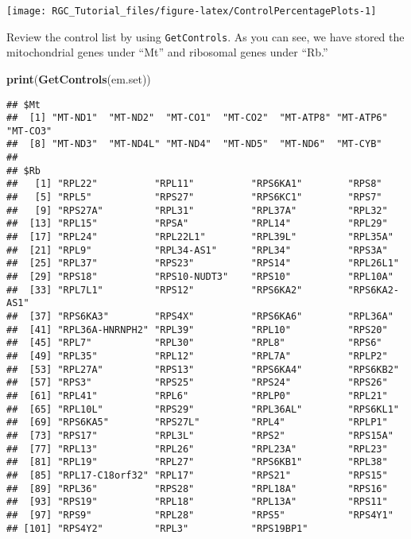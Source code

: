 \documentclass[]{article}
\newenvironment{Shaded}{\begin{snugshade}}{\end{snugshade}}
\newcommand{\KeywordTok}[1]{\textcolor[rgb]{0.13,0.29,0.53}{\textbf{#1}}}
\newcommand{\NormalTok}[1]{#1}
\begin{document}
\begin{center}\texttt{[image: RGC\_Tutorial\_files/figure-latex/ControlPercentagePlots-1]} \end{center}

Review the control list by using \texttt{GetControls}. As you can see,
we have stored the mitochondrial genes under ``Mt'' and ribosomal genes
under ``Rb.''

\begin{Shaded}
\begin{Highlighting}[]
\KeywordTok{print}\NormalTok{(}\KeywordTok{GetControls}\NormalTok{(em.set))}
\end{Highlighting}
\end{Shaded}

\begin{verbatim}
## $Mt
##  [1] "MT-ND1"  "MT-ND2"  "MT-CO1"  "MT-CO2"  "MT-ATP8" "MT-ATP6" "MT-CO3" 
##  [8] "MT-ND3"  "MT-ND4L" "MT-ND4"  "MT-ND5"  "MT-ND6"  "MT-CYB" 
## 
## $Rb
##   [1] "RPL22"          "RPL11"          "RPS6KA1"        "RPS8"          
##   [5] "RPL5"           "RPS27"          "RPS6KC1"        "RPS7"          
##   [9] "RPS27A"         "RPL31"          "RPL37A"         "RPL32"         
##  [13] "RPL15"          "RPSA"           "RPL14"          "RPL29"         
##  [17] "RPL24"          "RPL22L1"        "RPL39L"         "RPL35A"        
##  [21] "RPL9"           "RPL34-AS1"      "RPL34"          "RPS3A"         
##  [25] "RPL37"          "RPS23"          "RPS14"          "RPL26L1"       
##  [29] "RPS18"          "RPS10-NUDT3"    "RPS10"          "RPL10A"        
##  [33] "RPL7L1"         "RPS12"          "RPS6KA2"        "RPS6KA2-AS1"   
##  [37] "RPS6KA3"        "RPS4X"          "RPS6KA6"        "RPL36A"        
##  [41] "RPL36A-HNRNPH2" "RPL39"          "RPL10"          "RPS20"         
##  [45] "RPL7"           "RPL30"          "RPL8"           "RPS6"          
##  [49] "RPL35"          "RPL12"          "RPL7A"          "RPLP2"         
##  [53] "RPL27A"         "RPS13"          "RPS6KA4"        "RPS6KB2"       
##  [57] "RPS3"           "RPS25"          "RPS24"          "RPS26"         
##  [61] "RPL41"          "RPL6"           "RPLP0"          "RPL21"         
##  [65] "RPL10L"         "RPS29"          "RPL36AL"        "RPS6KL1"       
##  [69] "RPS6KA5"        "RPS27L"         "RPL4"           "RPLP1"         
##  [73] "RPS17"          "RPL3L"          "RPS2"           "RPS15A"        
##  [77] "RPL13"          "RPL26"          "RPL23A"         "RPL23"         
##  [81] "RPL19"          "RPL27"          "RPS6KB1"        "RPL38"         
##  [85] "RPL17-C18orf32" "RPL17"          "RPS21"          "RPS15"         
##  [89] "RPL36"          "RPS28"          "RPL18A"         "RPS16"         
##  [93] "RPS19"          "RPL18"          "RPL13A"         "RPS11"         
##  [97] "RPS9"           "RPL28"          "RPS5"           "RPS4Y1"        
## [101] "RPS4Y2"         "RPL3"           "RPS19BP1"
\end{verbatim}
\end{document}
